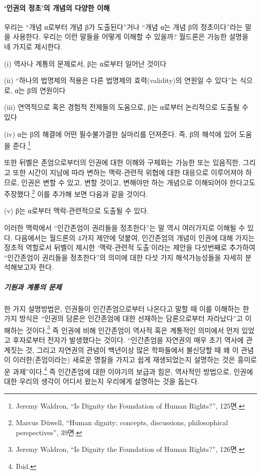 \paragraph{`인권의 정초'의 개념의 다양한 이해}

우리는 ``개념 α로부터 개념 β가 도출된다''거나 ``개념 α는 개념 β의 정초이다''라는 말을 사용한다. 우리는 이런 말들을 어떻게 이해할 수 있을까? 월드론은 가능한 설명을 네 가지로 제시한다.

\begin{displayquote}
(i) 역사나 계통의 문제로서, β는 α로부터 일어난 것이다

(ii) ``하나의 법명제의 적용은 다른 법명제의 효력(validity)의 연원일 수 있다''는 식으로, α는 β의 연원이다

(iii) 연역적으로 혹은 경험적 전제들의 도움으로, β는 α로부터 논리적으로 도출될 수 있다

(iv) α는 β의 해결에 어떤 필수불가결한 실마리를 던져준다. 즉, β의 해석에 있어 도움을 준다.\footnote{Jeremy Waldron, ``Is Dignity the Foundation of Human Rights?'', 125면.}
\end{displayquote}

또한 뒤벨은 존엄으로부터의 인권에 대한 이해와 구체화는 가능한 또는 있음직한, 그리고 또한 시간이 지남에 따라 변하는 맥락-관련적 위협에 대한 대응으로 이루어져야 하므로, 인권은 변할 수 있고, 변할 것이고, 변해야만 하는 개념으로 이해되어야 한다고도 주장했다.\footnote{Marcus Düwell, ``Human dignity: concepts, discussions, philosophical perspectives'', 39면.} 이를 추가해 보면 다음과 같을 것이다.

\begin{displayquote}
(v) β는 α로부터 맥락-관련적으로 도출될 수 있다.
\end{displayquote}

이러한 맥락에서 ``인간존엄이 권리들을 정초한다''는 말 역시 여러가지로 이해될 수 있다. 다음에서는 월드론의 4가지 제안에 덧붙여, 인간존엄의 개념이 인권에 대해 가지는 정초적 역할로서 뒤벨이 제시한 `맥락-관련적 도출'이라는 제안을 다섯번째로 추가하여 ``인간존엄이 권리들을 정초한다''의 의미에 대한 다섯 가지 해석가능성들을 자세히 분석해보고자 한다.

\subparagraph{기원과 계통의 문제}

한 가지 설명방법은, 인권들이 인간존엄으로부터 나온다고 말할 때 이를 이해하는 한 가지 방식은 ``인권의 담론은 인간존엄에 대한 선재하는 담론으로부터 자라났다''고 이해하는 것이다.\footnote{Jeremy Waldron, ``Is Dignity the Foundation of Human Rights?'', 126면.} 즉 인권에 비해 인간존엄이 역사적 혹은 계통적인 의미에서 먼저 있었고 후자로부터 전자가 발생했다는 것이다. ``인간존엄을 자연권의 매우 초기 역사에 관계짓는 것, 그리고 자연권의 관념이 백년이상 많은 학파들에서 불신당할 때 왜 이 관념이 이러한(존엄이라는) 새로운 명찰을 가지고 쉽게 재생되었는지 설명하는 것은 흥미로운 과제''이다.\footnote{Ibid.} 즉 인간존엄에 대한 이야기의 보급과 힘은, 역사적인 방법으로, 인권에 대한 우리의 생각이 어디서 왔는지 우리에게 설명하는 것을 돕는다.

